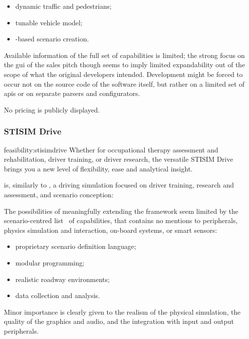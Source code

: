 \begin{itemize}
	\item dynamic traffic and pedestrians;
    \item tunable vehicle model;
    \item {}-based scenario creation.
\end{itemize}

Available information of the full set of capabilities is limited; the strong focus on the \gls{gui} of the sales pitch though seems to imply limited expandability out of the scope of what the original developers intended. Development might be forced to occur not on the source code of the software itself, but rather on a limited set of \glspl{api} or on separate parsers and configurators.

No pricing is publicly displayed.

\subsubsection{STISIM Drive}

\begin{excerpt}{feasibility:stisimdrive}
Whether for occupational therapy assessment and rehabilitation, driver training, or driver research, the versatile STISIM Drive brings you a new level of flexibility, ease and analytical insight.
\end{excerpt}

 is, similarly to , a driving simulation focused on driver training, research and assessment, and scenario conception:

The possibilities of meaningfully extending the \gls{framework} seem limited by the scenario-centred list~\cite{feasibility:stisimdrivefeatures} of capabilities, that contains no mentions to peripherals, physics simulation and interaction, on-board systems, or smart sensors:

\begin{itemize}
	\item proprietary scenario definition language;
    \item modular programming;
    \item realistic roadway environments;
    \item data collection and analysis.
\end{itemize}

Minor importance is clearly given to the realism of the physical simulation, the quality of the graphics and audio, and the integration with input and output peripherals.

